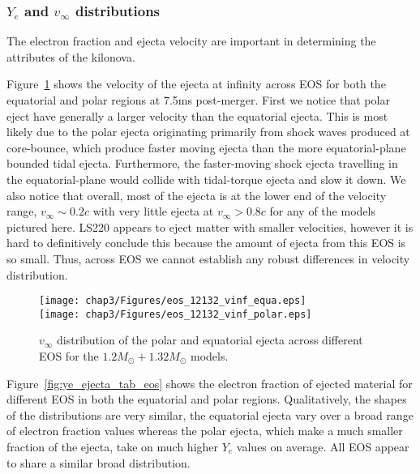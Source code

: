 
\subsubsection{$Y_e$ and $v_\infty$ distributions}

The electron fraction and ejecta velocity are important in determining the attributes of the kilonova.

Figure~\ref{fig:vinf_ejecta_tab_eos} shows the velocity of the ejecta at infinity across EOS for both the equatorial and polar regions at 7.5ms post-merger. First we notice that polar eject have generally a larger velocity than the equatorial ejecta. This is most likely due to the polar ejecta originating primarily from shock waves produced at core-bounce, which produce faster moving ejecta than the more equatorial-plane bounded tidal ejecta. Furthermore, the faster-moving shock ejecta travelling in the equatorial-plane would collide with tidal-torque ejecta and slow it down. %
We also notice that overall, most of the ejecta is at the lower end of the velocity range, $v_\infty \sim 0.2c$ with very little ejecta at $v_\infty > 0.8c$ for any of the models pictured here. LS220 appears to eject matter with smaller velocities, however it is hard to definitively conclude this because the amount of ejecta from this EOS is so small. Thus, across EOS we cannot establish any robust differences in velocity distribution.

\begin{figure}[!htbp]
  \centering
  \texttt{[image: chap3/Figures/eos\_12132\_vinf\_equa.eps]}\\
  \texttt{[image: chap3/Figures/eos\_12132\_vinf\_polar.eps]}
\caption{
   $v_\infty$ distribution of the polar and equatorial ejecta across different EOS for the $1.2M_\odot + 1.32M_\odot$ models.
}
\label{fig:vinf_ejecta_tab_eos}
\end{figure}

  Figure~\ref{fig:ye_ejecta_tab_eos} shows the electron fraction of ejected material for different EOS in both the equatorial and polar regions. Qualitatively, the shapes of the distributions are very similar, the equatorial ejecta vary over a broad range of electron fraction values whereas the polar ejecta, which make a much smaller fraction of the ejecta, take on much higher $Y_e$ values on average. All EOS appear to share a similar broad distribution.
  

